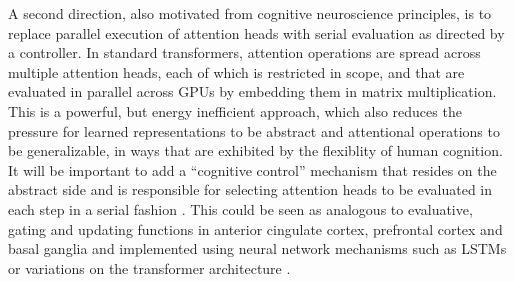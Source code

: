 
A second direction, also motivated from cognitive neuroscience principles, is to replace 
parallel execution of attention heads with serial evaluation as directed by a controller. 
In standard transformers, attention operations are spread across multiple attention heads,
each of which is restricted in scope, and that are evaluated in parallel across GPUs by embedding them in matrix
multiplication. This is a powerful, but energy inefficient approach, which also reduces the pressure for learned
representations to be abstract and attentional operations to be generalizable, in ways that are exhibited
by the flexiblity of human cognition.  It will be important to add a ``cognitive control'' mechanism that resides on
the abstract side and is responsible for selecting attention heads to be evaluated in each step in a serial fashion \citep{cohen2017cognitive}.  This could be seen as analogous to evaluative, gating and updating functions in anterior cingulate cortex, prefrontal cortex and basal ganglia
\citep{frank2001interactions,evc,braver2000control,wmPFC}
and implemented using neural network mechanisms such as LSTMs \citep{lstm} or variations on the transformer
architecture \citep{gamr}.


